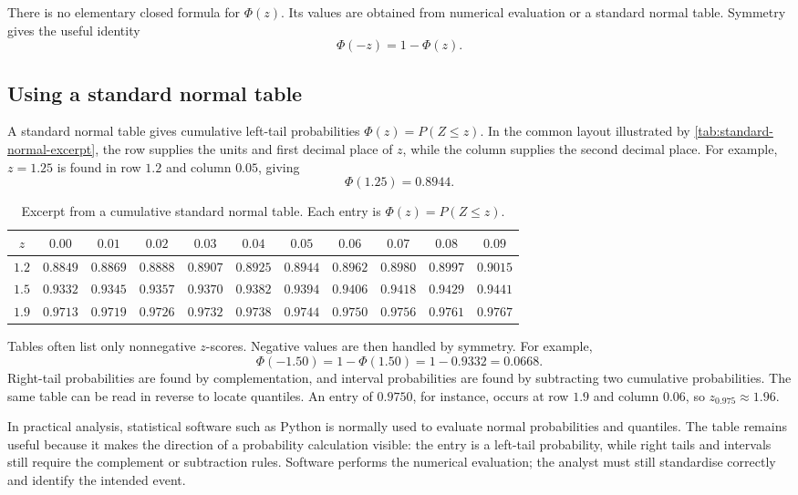 There is no elementary closed formula for $\Phi(z)$. Its values are obtained from numerical evaluation or a standard normal table. Symmetry gives the useful identity
\[
    \Phi(-z)=1-\Phi(z).
\]

\subsection{Using a standard normal table}

A standard normal table gives cumulative left-tail probabilities $\Phi(z)=P(Z\leq z)$. In the common layout illustrated by \autoref{tab:standard-normal-excerpt}, the row supplies the units and first decimal place of $z$, while the column supplies the second decimal place. For example, $z=1.25$ is found in row $1.2$ and column $0.05$, giving
\[
    \Phi(1.25)=0.8944.
\]

\begin{table}[htbp]
\centering
\caption{Excerpt from a cumulative standard normal table. Each entry is $\Phi(z)=P(Z\leq z)$.}
\label{tab:standard-normal-excerpt}
\small
\setlength{\tabcolsep}{3.2pt}
\renewcommand{\arraystretch}{1.15}
\begin{tabular}{@{}c*{10}{c}@{}}
\toprule
$z$ & $0.00$ & $0.01$ & $0.02$ & $0.03$ & $0.04$ & $0.05$ & $0.06$ & $0.07$ & $0.08$ & $0.09$ \\
\midrule
$1.2$ & $0.8849$ & $0.8869$ & $0.8888$ & $0.8907$ & $0.8925$ & $0.8944$ & $0.8962$ & $0.8980$ & $0.8997$ & $0.9015$ \\
$1.5$ & $0.9332$ & $0.9345$ & $0.9357$ & $0.9370$ & $0.9382$ & $0.9394$ & $0.9406$ & $0.9418$ & $0.9429$ & $0.9441$ \\
$1.9$ & $0.9713$ & $0.9719$ & $0.9726$ & $0.9732$ & $0.9738$ & $0.9744$ & $0.9750$ & $0.9756$ & $0.9761$ & $0.9767$ \\
\bottomrule
\end{tabular}
\end{table}

Tables often list only nonnegative $z$-scores. Negative values are then handled by symmetry. For example,
\[
    \Phi(-1.50)=1-\Phi(1.50)=1-0.9332=0.0668.
\]
Right-tail probabilities are found by complementation, and interval probabilities are found by subtracting two cumulative probabilities. The same table can be read in reverse to locate quantiles. An entry of $0.9750$, for instance, occurs at row $1.9$ and column $0.06$, so $z_{0.975}\approx1.96$.

In practical analysis, statistical software such as Python is normally used to evaluate normal probabilities and quantiles. The table remains useful because it makes the direction of a probability calculation visible: the entry is a left-tail probability, while right tails and intervals still require the complement or subtraction rules. Software performs the numerical evaluation; the analyst must still standardise correctly and identify the intended event.

